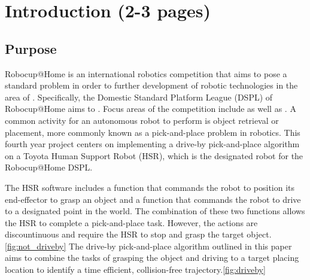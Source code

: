 \documentclass[12pt]{article}
\begin{document}
\section{Introduction (2-3 pages)}
    \subsection{Purpose}
        Robocup@Home is an international robotics competition that aims to pose a standard problem in order to further development of robotic technologies in the area of \cite{noauthor_robocuphome_2020}. Specifically, the Domestic Standard Platform League (DSPL) of Robocup@Home aims to \cite{noauthor_robocuphome_2020}. Focus areas of the competition include  as well as \cite{noauthor_robocuphome_2020}. A common activity for an autonomous robot to perform is object retrieval or placement, more commonly known as a pick-and-place problem in robotics. This fourth year project centers on implementing a drive-by pick-and-place algorithm on a Toyota Human Support Robot (HSR), which is the designated robot for the Robocup@Home DSPL. 

        The HSR software includes a function that commands the robot to position its end-effector to grasp an object and a function that commands the robot to drive to a designated point in the world. The combination of these two functions allows the HSR to complete a pick-and-place task. However, the actions are discountinuous and require the HSR to stop and grasp the target object.\cref{fig:not_driveby} The drive-by pick-and-place algorithm outlined in this paper aims to combine the tasks of grasping the object and driving to a target placing location to identify a time efficient, collision-free trajectory.\cref{fig:driveby}
    
\end{document}
